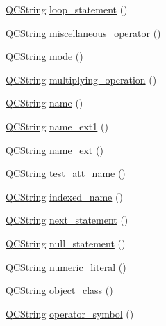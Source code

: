 \begin{DoxyCompactItemize}
\item 
\hyperlink{class_q_c_string}{Q\+C\+String} \hyperlink{classvhdl_1_1parser_1_1_vhdl_parser_acec5a249326d076510cbeb45ce269b80}{loop\+\_\+statement} ()
\item 
\hyperlink{class_q_c_string}{Q\+C\+String} \hyperlink{classvhdl_1_1parser_1_1_vhdl_parser_a63b27e713d84b3b772830911b1dfcf72}{miscellaneous\+\_\+operator} ()
\item 
\hyperlink{class_q_c_string}{Q\+C\+String} \hyperlink{classvhdl_1_1parser_1_1_vhdl_parser_a4013b45019775485362dfd644727320c}{mode} ()
\item 
\hyperlink{class_q_c_string}{Q\+C\+String} \hyperlink{classvhdl_1_1parser_1_1_vhdl_parser_aa4dcaa59166af96b2ffafa767a1c9d0f}{multiplying\+\_\+operation} ()
\item 
\hyperlink{class_q_c_string}{Q\+C\+String} \hyperlink{classvhdl_1_1parser_1_1_vhdl_parser_ada7fae426cc1cfe69c28256fd943b23a}{name} ()
\item 
\hyperlink{class_q_c_string}{Q\+C\+String} \hyperlink{classvhdl_1_1parser_1_1_vhdl_parser_a1a7619668a671a8a1b4d80f1b310f6b8}{name\+\_\+ext1} ()
\item 
\hyperlink{class_q_c_string}{Q\+C\+String} \hyperlink{classvhdl_1_1parser_1_1_vhdl_parser_a9f4d1c750a9f4ed7ebf74ecc72eebe16}{name\+\_\+ext} ()
\item 
\hyperlink{class_q_c_string}{Q\+C\+String} \hyperlink{classvhdl_1_1parser_1_1_vhdl_parser_a22df3e86d39c3d8cf38f74c511ad7c0d}{test\+\_\+att\+\_\+name} ()
\item 
\hyperlink{class_q_c_string}{Q\+C\+String} \hyperlink{classvhdl_1_1parser_1_1_vhdl_parser_abfdba200fca2b8f2462abb508c9e9c7c}{indexed\+\_\+name} ()
\item 
\hyperlink{class_q_c_string}{Q\+C\+String} \hyperlink{classvhdl_1_1parser_1_1_vhdl_parser_ac3c71751708f6d62299def344269e3b1}{next\+\_\+statement} ()
\item 
\hyperlink{class_q_c_string}{Q\+C\+String} \hyperlink{classvhdl_1_1parser_1_1_vhdl_parser_a6aeaad6affcb650dab265dd331b3d0f8}{null\+\_\+statement} ()
\item 
\hyperlink{class_q_c_string}{Q\+C\+String} \hyperlink{classvhdl_1_1parser_1_1_vhdl_parser_a850d2c76cdb9b09bfa487777563a69a0}{numeric\+\_\+literal} ()
\item 
\hyperlink{class_q_c_string}{Q\+C\+String} \hyperlink{classvhdl_1_1parser_1_1_vhdl_parser_a2434345898d4470518c2de70ce4c0483}{object\+\_\+class} ()
\item 
\hyperlink{class_q_c_string}{Q\+C\+String} \hyperlink{classvhdl_1_1parser_1_1_vhdl_parser_acb81df30c784551d4ca85236abcf6d5f}{operator\+\_\+symbol} ()

\end{DoxyCompactItemize}
